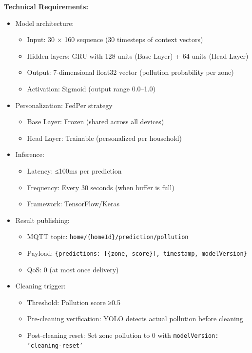 \documentclass[conference]{IEEEtran}
\begin{document}
\begin{enumerate}
\textbf{Technical Requirements:}
\begin{itemize}
    \item Model architecture:
    \begin{itemize}
        \item Input: 30 × 160 sequence (30 timesteps of context vectors)
        \item Hidden layers: GRU with 128 units (Base Layer) + 64 units (Head Layer)
        \item Output: 7-dimensional float32 vector (pollution probability per zone)
        \item Activation: Sigmoid (output range 0.0–1.0)
    \end{itemize}
    \item Personalization: FedPer strategy
    \begin{itemize}
        \item Base Layer: Frozen (shared across all devices)
        \item Head Layer: Trainable (personalized per household)
    \end{itemize}
    \item Inference:
    \begin{itemize}
        \item Latency: ≤100ms per prediction
        \item Frequency: Every 30 seconds (when buffer is full)
        \item Framework: TensorFlow/Keras
    \end{itemize}
    \item Result publishing:
    \begin{itemize}
        \item MQTT topic: \texttt{home/\{homeId\}/prediction/pollution}
        \item Payload: \texttt{\{predictions: [\{zone, score\}], timestamp, modelVersion\}}
        \item QoS: 0 (at most once delivery)
    \end{itemize}
    \item Cleaning trigger:
    \begin{itemize}
        \item Threshold: Pollution score ≥0.5
        \item Pre-cleaning verification: YOLO detects actual pollution before cleaning
        \item Post-cleaning reset: Set zone pollution to 0 with \texttt{modelVersion: 'cleaning-reset'}
    \end{itemize}
\end{itemize}

\end{enumerate}
\end{document}
